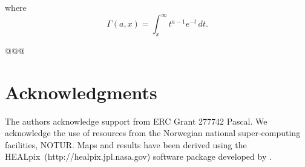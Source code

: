 \documentclass[aps,prd,showpacs,superscriptaddress,groupedaddress]{revtex4-1}  %
\newcommand{\healpix}{HEALpix~}
\begin{document}
where $$\Gamma(a,x)=\int_{x}^{\infty} t^{a-1}e^{-t}\,dt.$$

@@@

\section{Acknowledgments}
The authors acknowledge support from ERC Grant 277742 Pascal.
We acknowledge the use of resources from the
Norwegian national super-computing facilities, NOTUR. Maps and results
have been derived using the \healpix (http://healpix.jpl.nasa.gov)
software package developed by \cite{healpix}.


%

%
\end{document}
